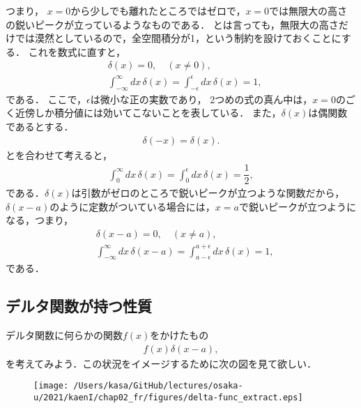 \noindent
つまり，
$x=0$から少しでも離れたところではゼロで，$x=0$では無限大の高さの鋭いピークが立っているようなものである．
とは言っても，無限大の高さだけでは漠然としているので，全空間積分が1，という制約を設けておくことにする．
これを数式に直すと，
%
%
\begin{align}
 & \delta \left(x\right) = 0, \quad (x\neq 0), \label{delta_func_def_01}\\
 &  \int_{-\infty}^{\infty} dx\,\delta\left(x\right) = \int_{-\epsilon}^{\epsilon} dx\,\delta\left(x\right) = 1,\label{delta_func_def_02}
\end{align}
である．
%
ここで，$\epsilon$は微小な正の実数であり，
2つめの式の真ん中は，$x=0$のごく近傍しか積分値には効いてこないことを表している．
また，$\delta(x)$は偶関数であるとする．
\begin{align}
 \delta (-x) = \delta (x). \label{delta_func_def_03}
\end{align}
とを合わせて考えると，
\begin{align}
 \int_{0}^{\infty}dx\,\delta(x) = \int_{0}^{\epsilon}dx\,\delta(x) = \dfrac{1}{2}, 
\end{align}
である．$\delta (x)$は引数がゼロのところで鋭いピークが立つような関数だから，
$\delta (x-a)$のように定数がついている場合には，$x=a$で鋭いピークが立つようになる，つまり，
\begin{align}
 & \delta \left(x-a\right) = 0, \quad (x\neq a),\\
 &  \int_{-\infty}^{\infty} dx\,\delta\left(x-a\right) = \int_{a-\epsilon}^{a+\epsilon} dx\,\delta\left(x\right) = 1, \label{delta_func_shift}
\end{align}
である．
%
\subsection{デルタ関数が持つ性質}
%
デルタ関数に何らかの関数$f(x)$をかけたもの
\begin{align}
  f\left(x\right)\delta\left(x-a\right),
\end{align}
を考えてみよう．この状況をイメージするために次の図を見て欲しい．

\begin{figure}[htbp]
  \centering
  \texttt{[image: /Users/kasa/GitHub/lectures/osaka-u/2021/kaenI/chap02\_fr/figures/delta-func\_extract.eps]} 
\end{figure}

